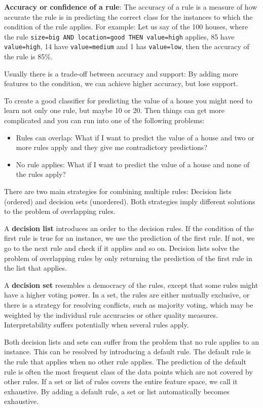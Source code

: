 \documentclass[
  11pt,
]{scrbook}
\providecommand{\tightlist}{%
  \setlength{\itemsep}{0pt}\setlength{\parskip}{0pt}}
\begin{document}
\textbf{Accuracy or confidence of a rule}:
The accuracy of a rule is a measure of how accurate the rule is in predicting the correct class for the instances to which the condition of the rule applies.
For example:
Let us say of the 100 houses, where the rule \texttt{size=big\ AND\ location=good\ THEN\ value=high} applies, 85 have \texttt{value=high}, 14 have \texttt{value=medium} and 1 has \texttt{value=low}, then the accuracy of the rule is 85\%.

Usually there is a trade-off between accuracy and support:
By adding more features to the condition, we can achieve higher accuracy, but lose support.

To create a good classifier for predicting the value of a house you might need to learn not only one rule, but maybe 10 or 20.
Then things can get more complicated and you can run into one of the following problems:

\begin{itemize}
\tightlist
\item
  Rules can overlap:
  What if I want to predict the value of a house and two or more rules apply and they give me contradictory predictions?
\item
  No rule applies:
  What if I want to predict the value of a house and none of the rules apply?
\end{itemize}

There are two main strategies for combining multiple rules:
Decision lists (ordered) and decision sets (unordered).
Both strategies imply different solutions to the problem of overlapping rules.

A \textbf{decision list} introduces an order to the decision rules.
If the condition of the first rule is true for an instance, we use the prediction of the first rule.
If not, we go to the next rule and check if it applies and so on.
Decision lists solve the problem of overlapping rules by only returning the prediction of the first rule in the list that applies.

A \textbf{decision set} resembles a democracy of the rules, except that some rules might have a higher voting power.
In a set, the rules are either mutually exclusive, or there is a strategy for resolving conflicts, such as majority voting, which may be weighted by the individual rule accuracies or other quality measures.
Interpretability suffers potentially when several rules apply.

Both decision lists and sets can suffer from the problem that no rule applies to an instance.
This can be resolved by introducing a default rule.
The default rule is the rule that applies when no other rule applies.
The prediction of the default rule is often the most frequent class of the data points which are not covered by other rules.
If a set or list of rules covers the entire feature space, we call it exhaustive.
By adding a default rule, a set or list automatically becomes exhaustive.
\end{document}
